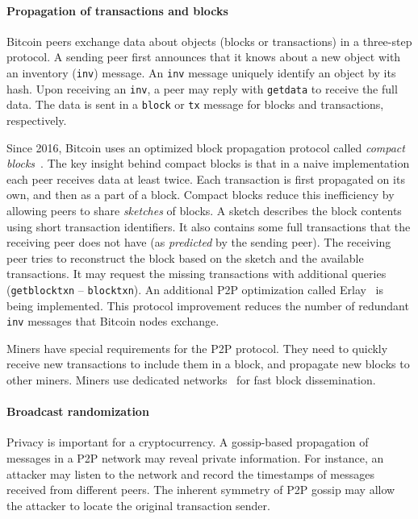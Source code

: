 \paragraph{Propagation of transactions and blocks}

Bitcoin peers exchange data about objects (blocks or transactions) in a three-step protocol.
A sending peer first announces that it knows about a new object with an inventory (\texttt{inv}) message.
An \texttt{inv} message uniquely identify an object by its hash.
Upon receiving an \texttt{inv}, a peer may reply with \texttt{getdata} to receive the full data.
The data is sent in a \texttt{block} or \texttt{tx} message for blocks and transactions, respectively.

Since 2016, Bitcoin uses an optimized block propagation protocol called \textit{compact blocks}~\cite{Core2016}.
The key insight behind compact blocks is that in a naive implementation each peer receives data at least twice.
Each transaction is first propagated on its own, and then as a part of a block.
Compact blocks reduce this inefficiency by allowing peers to share \textit{sketches} of blocks.
A sketch describes the block contents using short transaction identifiers.
It also contains some full transactions that the receiving peer does not have (as \textit{predicted} by the sending peer).
The receiving peer tries to reconstruct the block based on the sketch and the available transactions.
It may request the missing transactions with additional queries (\texttt{getblocktxn} -- \texttt{blocktxn}).
An additional P2P optimization called Erlay~\cite{Naumenko2019} is being implemented.
This protocol improvement reduces the number of redundant \texttt{inv} messages that Bitcoin nodes exchange.

Miners have special requirements for the P2P protocol.
They need to quickly receive new transactions to include them in a block, and propagate new blocks to other miners.
Miners use dedicated networks~\cite{FALCON, FIBRE} for fast block dissemination.


\paragraph{Broadcast randomization}

Privacy is important for a cryptocurrency.
A gossip-based propagation of messages in a P2P network may reveal private information.
For instance, an attacker may listen to the network and record the timestamps of messages received from different peers.
The inherent symmetry of P2P gossip may allow the attacker to locate the original transaction sender.

